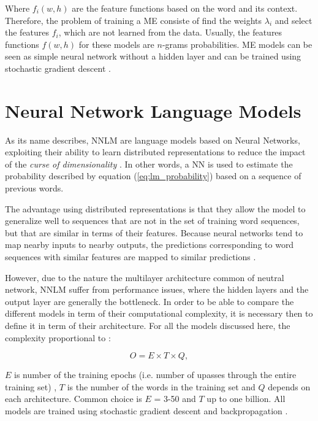 Where $f_i(w,h)$ are  the feature functions based on the word and its
context. Therefore, the problem of training a  \ac{ME} consiste of  find the
weights  $\lambda_i$ and select the features $f_i$, which are not learned from
the data. Usually, the features functions $f(w,h)$ for these  models are
$n$-grams probabilities. \ac{ME} models can
be seen as simple neural network without a hidden layer and can be trained
using stochastic gradient descent \cite{Bishop:1995:NNP:525960, mikolovphd2012}.




\section{Neural Network Language Models}
\label{sec:nnlms-intro}

As its name describes,  \ac{NNLM} are  language models based on Neural Networks, exploiting their
ability to learn distributed representations to reduce the impact of the
\textit{curse of dimensionality} \cite{Bengio:2008}. In other words, a \ac{NN} is
used to estimate the probability described  by equation (\ref{eq:lm_probability}) based on a sequence of
previous words.

The advantage  using  distributed representations  is that they allow
the model to generalize well to sequences that are not in the set of training
word sequences, but that are similar in terms of their features. Because neural networks tend to map nearby inputs
to nearby outputs, the predictions corresponding to word sequences with
similar features are mapped to similar predictions \cite{Bengio:2008,Bengio:2003:NPL:944919.944966}.

However, due to the nature the multilayer architecture common of neutral
network, \ac{NNLM}  suffer from  
performance issues, where the hidden layers and the output layer are
generally the bottleneck. In order to be able to compare the different
models in term of their computational complexity, it is necessary then to define it in
term of their architecture. For all the models discussed here, the  complexity proportional to \cite{DBLP:journals/corr/abs-1301-3781}:

\begin{center}
\begin{equation} O = E \times T \times Q,   \end{equation}
\end{center}

$E$ is number of the training epochs (i.e.  number of upasses through the entire training set) , $T$ is the number of the words in
the training set and $Q$ depends on each architecture. Common choice is $E$ = 3-50 and $T$ up to one billion.
All models are trained using stochastic gradient descent and backpropagation
\cite{Bengio:2003:NPL:944919.944966,DBLP:journals/corr/abs-1301-3781}.


